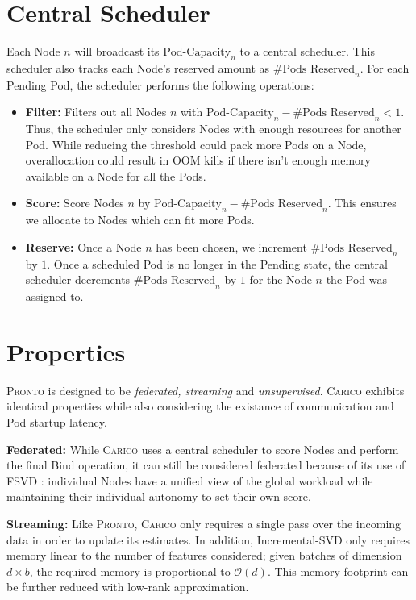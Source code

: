 \section{Central Scheduler}
Each Node $n$ will broadcast its $\text{Pod-Capacity}_n$ to a central scheduler. This
scheduler also tracks each Node's reserved amount as $\text{\# Pods Reserved}_n$. For
each Pending Pod, the scheduler performs the following operations:
\begin{itemize}
    \item \textbf{Filter:} Filters out all Nodes $n$ with $\text{Pod-Capacity}_n -
        \text{\# Pods Reserved}_n < 1$. Thus, the scheduler only considers Nodes
        with enough resources for another Pod. While reducing the threshold
        could pack more Pods on a Node, overallocation could result in OOM kills
        if there isn't enough memory available on a Node for all the Pods.
    \item \textbf{Score:} Score Nodes $n$ by $\text{Pod-Capacity}_n - \text{\#
        Pods Reserved}_n$. This ensures we allocate to Nodes which can fit more
        Pods.
    \item \textbf{Reserve:} Once a Node $n$ has been chosen, we increment
        $\text{\# Pods Reserved}_n$ by $1$. Once a scheduled Pod
        is no longer in the Pending state, the central scheduler decrements
        $\text{\# Pods Reserved}_n$ by $1$ for the Node $n$ the Pod was assigned
        to.
\end{itemize}

\section{Properties}
\textsc{Pronto} is designed to be \textit{federated, streaming} and
\textit{unsupervised}. \textsc{Carico} exhibits identical properties while also
considering the existance of communication and Pod startup latency.

\textbf{Federated:}
While \textsc{Carico} uses a central scheduler to score Nodes and perform the final
Bind operation, it can still be considered federated because of its use
of FSVD \cite{}: individual Nodes have a unified view of the global workload
while maintaining their individual autonomy to set their own score.

\textbf{Streaming:} Like \textsc{Pronto}, \textsc{Carico} only requires a single
pass over the incoming data in order to update its estimates. In addition,
Incremental-SVD only requires memory linear to the number of features
considered; given batches of dimension $d \times b$, the required memory is
proportional to $\mathcal{O}(d)$. This memory footprint can be further reduced
with low-rank approximation.

